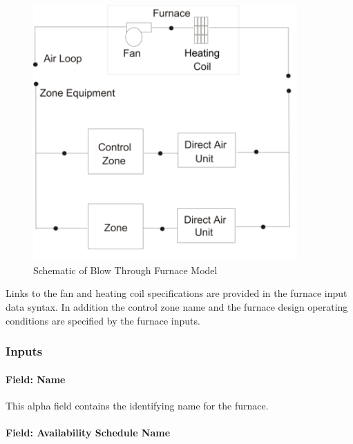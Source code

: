 \begin{figure}[hbtp] %
\centering
\includegraphics[width=0.9\textwidth, height=0.9\textheight, keepaspectratio=true]{media/image302.png}
\caption{Schematic of Blow Through Furnace Model \protect \label{fig:schematic-of-blow-through-furnace-model}}
\end{figure}

Links to the fan and heating coil specifications are provided in the furnace input data syntax. In addition the control zone name and the furnace design operating conditions are specified by the furnace inputs.

\subsubsection{Inputs}\label{inputs-5-033}

\paragraph{Field: Name}\label{field-name-6-025}

This alpha field contains the identifying name for the furnace.

\paragraph{Field: Availability Schedule Name}\label{field-availability-schedule-name-5-004}

